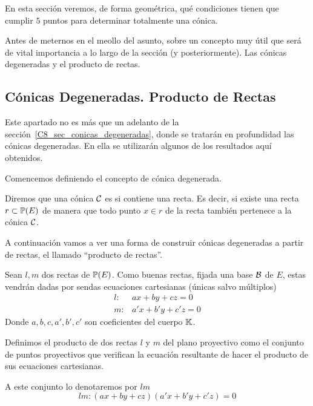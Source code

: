 En esta sección veremos, de forma geométrica, qué condiciones tienen que cumplir $5$ puntos para determinar totalmente una cónica.

Antes de meternos en el meollo del asunto, sobre un concepto muy útil que será de vital importancia a lo largo de la sección (y posteriormente). Las cónicas degeneradas y el producto de rectas.
\subsection{Cónicas Degeneradas. Producto de Rectas}
\label{C8_subsec_producto_rectas}
Este apartado no es más que un adelanto de la sección~\ref{C8_sec_conicas_degeneradas}, donde se tratarán en profundidad las cónicas degeneradas. En ella se utilizarán algunos de los resultados aquí obtenidos.

Comencemos definiendo el concepto de cónica degenerada.
\begin{defi}
	Diremos que una cónica $\mathcal{C}$ es  si contiene una recta. Es decir, si existe una recta $r\subset\mathbb{P}(E)$ de manera que todo punto $x\in r$ de la recta también pertenece a la cónica $\mathcal{C}$.
\end{defi}
A continuación vamos a ver una forma de construir cónicas degeneradas a partir de rectas, el llamado ``producto de rectas''.

Sean $l,m$ dos rectas de $\mathbb{P}(E)$. Como buenas rectas, fijada una base $\mathcal{B}$ de $E$, estas vendrán dadas por sendas ecuaciones cartesianas (únicas salvo múltiplos)
\[\begin{array}{cc}
l: & ax+by+cz=0\\
m: & a'x+b'y+c'z=0
\end{array}\]
Donde $a,b,c,a',b',c'$ son coeficientes del cuerpo $\mathbb{K}$.
\begin{defi}
	Definimos el producto de dos rectas $l$ y $m$ del plano proyectivo como el conjunto de puntos proyectivos que verifican la ecuación resultante de hacer el producto de sus ecuaciones cartesianas.
	
	A este conjunto lo denotaremos por $lm$
	\begin{equation}lm:(ax+by+cz)(a'x+b'y+c'z)=0\end{equation}
\end{defi}

